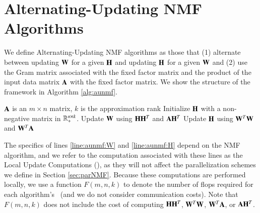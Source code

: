 \section{Alternating-Updating NMF Algorithms}
\label{sec:aunmf}

We define Alternating-Updating NMF algorithms as those that (1) alternate between updating $\WW$ for a given $\HH$ and updating $\HH$ for a given $\WW$ and (2) use the Gram matrix associated with the fixed factor matrix and the product of the input data matrix $\AA$ with the fixed factor matrix.
We show the structure of the framework in Algorithm \ref{alg:aunmf}. 


\begin{algorithm}
\caption{$[\WW,\HH] = \text{AU-NMF}(A,k)$}
\label{alg:aunmf}
\begin{algorithmic}[1]
\Require $\AA$ is an $m\times n$ matrix, $k$ is the approximation rank
\State Initialize $\HH$ with a non-negative matrix in $\Rn{n\times k}_+$.
 \label{algo:nmfloop}
  \State Update $\WW$ using $\HH \HH^T$ and $\AA \HH^T$
  \label{line:aunmf:W}
  \State Update $\HH$ using $\WW^T\WW$ and $\WW^T \AA$
  \label{line:aunmf:H}
\EndWhile
\end{algorithmic}
\end{algorithm}


The specifics of lines \ref{line:aunmf:W} and  \ref{line:aunmf:H} depend on the NMF algorithm, and we refer to the computation associated with these lines as the Local Update Computations (\LUC), as they will not affect the parallelization schemes we define in Section \ref{sec:parNMF}.
Because these computations are performed locally, we use a function $F(m,n,k)$ to denote the number of flops required for each algorithm's \LUC\ (and we do not consider communication costs).
Note that $F(m,n,k)$ does not include the cost of computing $\HH\HH^T$, $\WW^T\WW$, $\WW^T\AA$, or $\AA\HH^T$.

